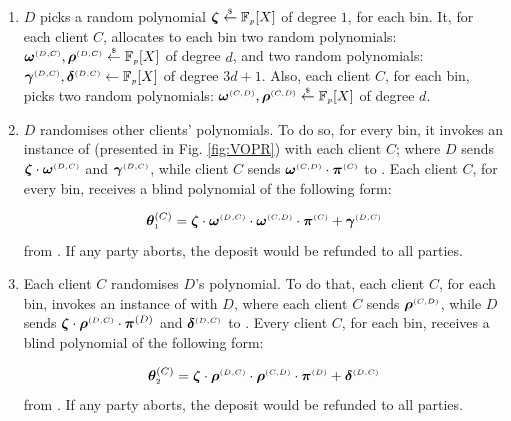 \begin{enumerate}
\item  $D$ picks a  random polynomial $\bm\zeta \stackrel{\scriptscriptstyle\$}\leftarrow \mathbb{F}_{\scriptscriptstyle p}[X]$ of degree $1$, for each bin.  
It, for each client $C$, allocates to each bin two random polynomials: $\bm\omega^{\scriptscriptstyle(D,C)}, \bm\rho^{\scriptscriptstyle (D,C)}\stackrel{\scriptscriptstyle\$}\leftarrow \mathbb{F}_{\scriptscriptstyle p}[X]$ of degree $d$, and  two  random polynomials: $\bm\gamma^{\scriptscriptstyle (D,C)}, \bm\delta^{\scriptscriptstyle (D,C)} \leftarrow \mathbb{F}_{\scriptscriptstyle p}[X]$ of degree $3d+1$. Also, each client $C$, for each bin, picks two  random polynomials: $\bm\omega^{\scriptscriptstyle (C,D)}, \bm\rho^{\scriptscriptstyle (C,D)}\stackrel{\scriptscriptstyle\$}\leftarrow \mathbb{F}_{\scriptscriptstyle p}[X]$ of degree $d$. %




\item\label{e-psi::D-randomises}  $D$ randomises other clients' polynomials. To do so, for every bin, it invokes an instance of {\vopr} (presented in Fig. \ref{fig:VOPR}) with  each client $  C$; where  $D$ sends $\bm\zeta \cdot \bm\omega^{\scriptscriptstyle  {  {(D,C)}}}$ and $\bm\gamma^{\scriptscriptstyle  {  {(D,C)}}}$, while client $ C$ sends $\bm\omega^{\scriptscriptstyle  {  {(C,D)}}}\cdot \bm\pi^{\scriptscriptstyle  {  {(C)}}}$ to {\vopr}. Each client $C$, for every bin, receives a blind polynomial of the following form: 

$$\bm\theta^{  {  {(C)}}}_{\scriptscriptstyle 1}=\bm\zeta \cdot \bm\omega^{\scriptscriptstyle  {  {(D,C)}}}\cdot \bm\omega^{\scriptscriptstyle  {  {(C,D)}}}\cdot \bm\pi^{\scriptscriptstyle  {  {(C)}}}+\bm\gamma^{\scriptscriptstyle  {  {(D,C)}}}$$
%
 from {\vopr}. If any party aborts, the deposit would be refunded to all parties.

\item\label{e-psi::C-randomises} Each client $    {  C}$ randomises  $ {D}$'s polynomial. To do that, each client $    {  C}$, for each bin,  invokes an instance of {\vopr} with   $ {D}$,    where each client $    {  C}$  sends $\bm\rho^{\scriptscriptstyle  {  {(C,D)}}}$, while  ${D}$  sends $\bm\zeta\cdot\bm \rho^{\scriptscriptstyle  {  {(D,C)}}}\cdot \bm\pi^{  {  {(D)}}}$ and $\bm\delta^{\scriptscriptstyle  {  {(D,C)}}}$ to {\vopr}. Every client   $    {  C}$, for each bin,  receives a blind polynomial of the following form: 

$$\bm\theta^{  {  {(C)}}}_{\scriptscriptstyle 2}=\bm\zeta \cdot \bm\rho^{\scriptscriptstyle  {  {(D,C)}}}\cdot \bm\rho^{\scriptscriptstyle  {  {(C,D)}}}\cdot \bm\pi^{\scriptscriptstyle  {  {(D)}}}+\bm\delta^{\scriptscriptstyle  {  {(D,C)}}}$$
 from {\vopr}. If any party aborts, the deposit would be refunded to all parties.



\end{enumerate}
